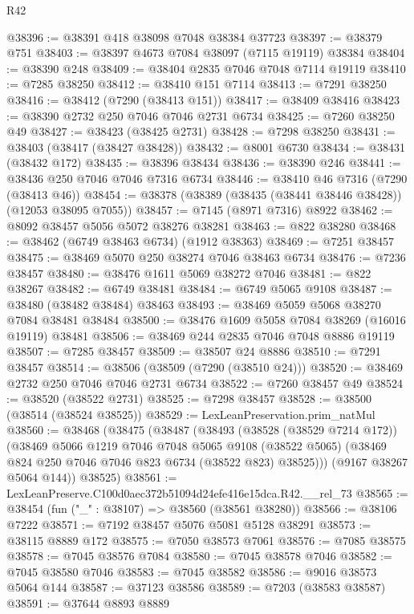 \begin{lexlean}{R42}
\begin{coremodule}
{@38396 := @38391 @418 @38098 @7048 @38384 @37723
@38397 := @38379 @751
@38403 := @38397 @4673 @7084 @38097 (@7115 @19119) @38384
@38404 := @38390 @248
@38409 := @38404 @2835 @7046 @7048 @7114 @19119
@38410 := @7285 @38250
@38412 := @38410 @151 @7114
@38413 := @7291 @38250
@38416 := @38412 (@7290 (@38413 @151))
@38417 := @38409 @38416
@38423 := @38390 @2732 @250 @7046 @7046 @2731 @6734
@38425 := @7260 @38250 @49
@38427 := @38423 (@38425 @2731)
@38428 := @7298 @38250
@38431 := @38403 (@38417 (@38427 @38428))
@38432 := @8001 @6730
@38434 := @38431 (@38432 @172)
@38435 := @38396 @38434
@38436 := @38390 @246
@38441 := @38436 @250 @7046 @7046 @7316 @6734
@38446 := @38410 @46 @7316 (@7290 (@38413 @46))
@38454 := @38378 (@38389 (@38435 (@38441 @38446 @38428)) (@12053 @38095 @7055))
@38457 := @7145 (@8971 @7316) @8922
@38462 := @8092 @38457 @5056 @5072 @38276 @38281
@38463 := @822 @38280
@38468 := @38462 (@6749 @38463 @6734) (@1912 @38363)
@38469 := @7251 @38457
@38475 := @38469 @5070 @250 @38274 @7046 @38463 @6734
@38476 := @7236 @38457
@38480 := @38476 @1611 @5069 @38272 @7046
@38481 := @822 @38267
@38482 := @6749 @38481
@38484 := @6749 @5065 @9108
@38487 := @38480 (@38482 @38484) @38463
@38493 := @38469 @5059 @5068 @38270 @7084 @38481 @38484
@38500 := @38476 @1609 @5058 @7084 @38269 (@16016 @19119) @38481
@38506 := @38469 @244 @2835 @7046 @7048 @8886 @19119
@38507 := @7285 @38457
@38509 := @38507 @24 @8886
@38510 := @7291 @38457
@38514 := @38506 (@38509 (@7290 (@38510 @24)))
@38520 := @38469 @2732 @250 @7046 @7046 @2731 @6734
@38522 := @7260 @38457 @49
@38524 := @38520 (@38522 @2731)
@38525 := @7298 @38457
@38528 := @38500 (@38514 (@38524 @38525))
@38529 := LexLeanPreservation.prim_natMul
@38560 := @38468
    (@38475
      (@38487
        (@38493
          (@38528 (@38529 @7214 @172))
          (@38469
            @5066
            @1219
            @7046
            @7048
            @5065
            @9108
            (@38522 @5065)
            (@38469 @824 @250 @7046 @7046 @823 @6734 (@38522 @823) @38525)))
        (@9167 @38267 @5064 @144))
      @38525)
@38561 := LexLeanPreserve.C100d0aec372b51094d24efe416e15dca.R42.__rel_73
@38565 := @38454 (fun ("_" : @38107) => @38560 (@38561 @38280))
@38566 := @38106 @7222
@38571 := @7192 @38457 @5076 @5081 @5128 @38291
@38573 := @38115 @8889 @172
@38575 := @7050 @38573 @7061
@38576 := @7085 @38575
@38578 := @7045 @38576 @7084
@38580 := @7045 @38578 @7046
@38582 := @7045 @38580 @7046
@38583 := @7045 @38582
@38586 := @9016 @38573 @5064 @144
@38587 := @37123 @38586
@38589 := @7203 (@38583 @38587)
@38591 := @37644 @8893 @8889
}
\end{coremodule}
\end{lexlean}

